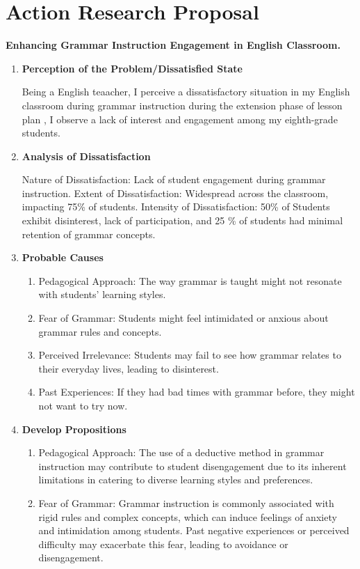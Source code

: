 \documentclass[12pt, a4paaper]{article}
\begin{document}
\section{Action Research Proposal}
\textbf{Enhancing Grammar Instruction Engagement in English Classroom.}
\begin{enumerate}
\item \textbf{Perception of the Problem/Dissatisfied State}
 
Being a  English teaacher, I perceive a dissatisfactory situation in my English classroom during grammar instruction during the extension phase of lesson plan , I observe a lack of interest and engagement among my eighth-grade students. 

\item \textbf{Analysis of Dissatisfaction}

Nature of Dissatisfaction: Lack of student engagement during grammar instruction.
Extent of Dissatisfaction: Widespread across the classroom, impacting 75\% of students.
Intensity of Dissatisfaction: 50\% of Students exhibit disinterest, lack of participation, and 25 \% of students had minimal retention of grammar concepts.

\item  \textbf{Probable Causes}
\begin{enumerate}
    \item Pedagogical Approach: The way grammar is taught might not resonate with students' learning styles.
    \item Fear of Grammar: Students might feel intimidated or anxious about grammar rules and concepts.
    \item Perceived Irrelevance: Students may fail to see how grammar relates to their everyday lives, leading to disinterest.
    \item Past Experiences: If they had bad times with grammar before, they might not want to try now.
\end{enumerate}
\item \textbf{Develop Propositions}
\begin{enumerate}
    \item Pedagogical Approach: The use of a deductive method in grammar instruction may contribute to student disengagement due to its inherent limitations in catering to diverse learning styles and preferences.
    \item Fear of Grammar: Grammar instruction is commonly associated with rigid rules and complex concepts, which can induce feelings of anxiety and intimidation among students. Past negative experiences or perceived difficulty may exacerbate this fear, leading to avoidance or disengagement.


\end{enumerate}
\end{enumerate}
\end{document}
